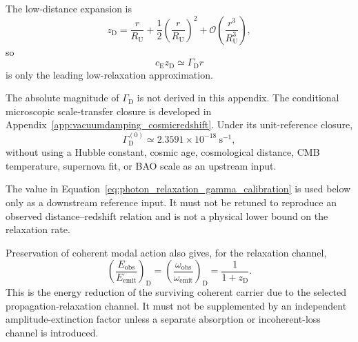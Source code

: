 The low-distance expansion is
\begin{equation}
    z_{\mathrm D}
    =
    \frac{
        r
    }{
        R_{\mathrm U}
    }
    +
    \frac{1}{2}
    \left(
        \frac{
            r
        }{
            R_{\mathrm U}
        }
    \right)^2
    +
    \mathcal{O}
    \left(
        \frac{
            r^{3}
        }{
            R_{\mathrm U}^{3}
        }
    \right),
    \label{eq:photon_relaxation_low_redshift_expansion}
\end{equation}
so
\begin{equation}
    c_{\mathrm E}z_{\mathrm D}
    \simeq
    \Gamma_{\mathrm D}r
    \label{eq:photon_relaxation_linear_redshift_limit}
\end{equation}
is only the leading low-relaxation approximation.

The absolute magnitude of \(\Gamma_{\mathrm D}\) is not derived in this
appendix. The conditional microscopic scale-transfer closure is developed in
Appendix~\ref{app:vacuumdamping_cosmicredshift}. Under its unit-reference
closure,
\begin{equation}
    \Gamma_{\mathrm D}^{(0)}
    \simeq
    2.3591
    \times
    10^{-18}
    \ \mathrm{s^{-1}},
    \label{eq:photon_relaxation_gamma_calibration}
\end{equation}
without using a Hubble constant, cosmic age, cosmological distance, CMB
temperature, supernova fit, or BAO scale as an upstream input.

The value in
Equation~\eqref{eq:photon_relaxation_gamma_calibration} is used below only as
a downstream reference input. It must not be retuned to reproduce an observed
distance--redshift relation and is not a physical lower bound on the
relaxation rate.

Preservation of coherent modal action also gives, for the relaxation channel,
\begin{equation}
    \left(
        \frac{
            E_{\mathrm{obs}}
        }{
            E_{\mathrm{emit}}
        }
    \right)_{\mathrm D}
    =
    \left(
        \frac{
            \omega_{\mathrm{obs}}
        }{
            \omega_{\mathrm{emit}}
        }
    \right)_{\mathrm D}
    =
    \frac{1}{1+z_{\mathrm D}}.
    \label{eq:photon_relaxation_energy_redshift}
\end{equation}
This is the energy reduction of the surviving coherent carrier due to the
selected propagation-relaxation channel. It must not be supplemented by an
independent amplitude-extinction factor unless a separate absorption or
incoherent-loss channel is introduced.

